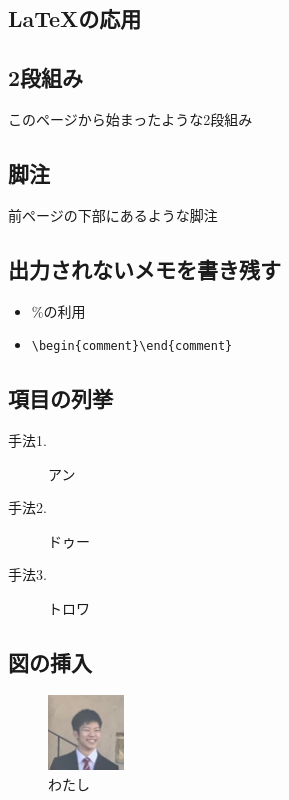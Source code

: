 \documentclass[a4paper]{jsarticle}
\begin{document}
\newpage
\begin{multicols}{2}


  \section{LaTeXの応用}


  \subsection{2段組み}
  このページから始まったような2段組み

  \subsection{脚注}
  前ページの下部にあるような脚注

  \subsection{出力されないメモを書き残す}
  \begin{itemize}
    \item \%の利用
    \item \verb|\begin{comment}\end{comment}|
  \end{itemize}


  \subsection{項目の列挙}
  \begin{description}
    \item [手法1.] アン
    \item [手法2.] ドゥー
    \item [手法3.] トロワ
  \end{description}


  \subsection{図の挿入}
  \renewcommand{\figurename}{図}
  \setcounter{figure}{2}
  \begin{figure}[H]
    \centering
    \includegraphics[width=20mm]{figures/Sample.jpg}
    \caption{わたし}
    \label{me}
  \end{figure}
  \noindent


\end{multicols}
\end{document}
